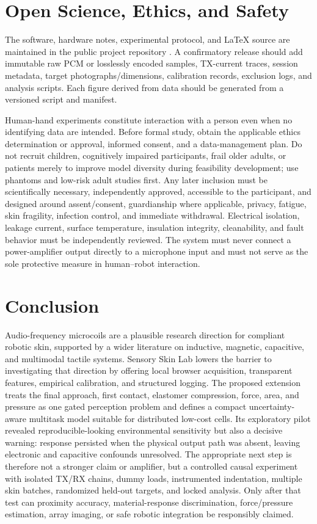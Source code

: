 \documentclass[10pt]{article}
\begin{document}
\section{Open Science, Ethics, and Safety}
The software, hardware notes, experimental protocol, and LaTeX source are maintained in the public project repository \citep{sensoryskin2026software}. A confirmatory release should add immutable raw PCM or losslessly encoded samples, TX-current traces, session metadata, target photographs/dimensions, calibration records, exclusion logs, and analysis scripts. Each figure derived from data should be generated from a versioned script and manifest.

Human-hand experiments constitute interaction with a person even when no identifying data are intended. Before formal study, obtain the applicable ethics determination or approval, informed consent, and a data-management plan. Do not recruit children, cognitively impaired participants, frail older adults, or patients merely to improve model diversity during feasibility development; use phantoms and low-risk adult studies first. Any later inclusion must be scientifically necessary, independently approved, accessible to the participant, and designed around assent/consent, guardianship where applicable, privacy, fatigue, skin fragility, infection control, and immediate withdrawal. Electrical isolation, leakage current, surface temperature, insulation integrity, cleanability, and fault behavior must be independently reviewed. The system must never connect a power-amplifier output directly to a microphone input and must not serve as the sole protective measure in human--robot interaction.

\section{Conclusion}
Audio-frequency microcoils are a plausible research direction for compliant robotic skin, supported by a wider literature on inductive, magnetic, capacitive, and multimodal tactile systems. Sensory Skin Lab lowers the barrier to investigating that direction by offering local browser acquisition, transparent features, empirical calibration, and structured logging. The proposed extension treats the final approach, first contact, elastomer compression, force, area, and pressure as one gated perception problem and defines a compact uncertainty-aware multitask model suitable for distributed low-cost cells. Its exploratory pilot revealed reproducible-looking environmental sensitivity but also a decisive warning: response persisted when the physical output path was absent, leaving electronic and capacitive confounds unresolved. The appropriate next step is therefore not a stronger claim or amplifier, but a controlled causal experiment with isolated TX/RX chains, dummy loads, instrumented indentation, multiple skin batches, randomized held-out targets, and locked analysis. Only after that test can proximity accuracy, material-response discrimination, force/pressure estimation, array imaging, or safe robotic integration be responsibly claimed.
\end{document}
